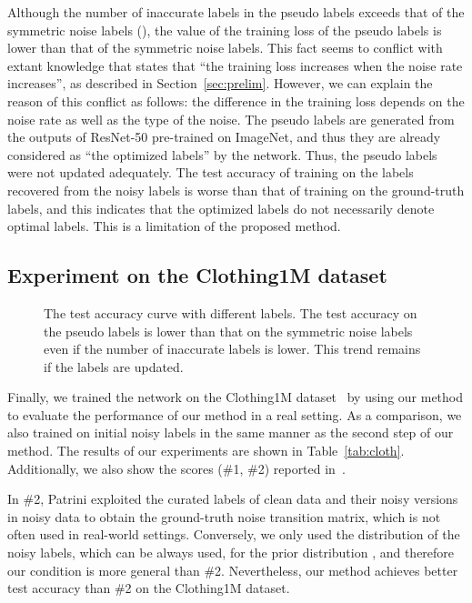 \documentclass[10pt,twocolumn,letterpaper]{article}
\newcommand{\Tref}[1]{Table~\ref{#1}}
\newcommand{\Sref}[1]{Section~\ref{#1}}
\begin{document}
Although the number of inaccurate labels in the pseudo labels exceeds that of the symmetric noise labels (), the value of the training loss of the pseudo labels is lower than that of the symmetric noise labels. This fact seems to conflict with extant knowledge that states that ``the training loss increases when the noise rate increases'', as described in \Sref{sec:prelim}. However, we can explain the reason of this conflict as follows: the difference in the training loss depends on the noise rate as well as the type of the noise.
The pseudo labels are generated from the outputs of ResNet-50 pre-trained on ImageNet, and thus they are already considered as ``the optimized labels'' by the network. Thus, the pseudo labels were not updated adequately.
The test accuracy of training on the labels recovered from the noisy labels is worse than that of training on the ground-truth labels, and this indicates that the optimized labels do not necessarily denote optimal labels. This is a limitation of the proposed method.

\subsection{Experiment on the Clothing1M dataset}\label{sec:cloth}
\begin{figure}[tb]
  \vspace{-5mm}
  \centering
  \caption{The test accuracy curve with different labels. The test accuracy on the pseudo labels is lower than that on the symmetric noise labels even if the number of inaccurate labels is lower. This trend remains if the labels are updated.}
  \label{fig:trans_a}
  \vspace{-4mm}
\end{figure}

Finally, we trained the network on the Clothing1M dataset~\cite{xiao2015learning} by using our method to evaluate the performance of our method in a real setting. As a comparison, we also trained on initial noisy labels in the same manner as the second step of our method. The results of our experiments are shown in \Tref{tab:cloth}. Additionally, we also show the scores (\#1, \#2) reported in~\cite{patrini2016making}.

In \#2, Patrini \etal exploited the curated labels of  clean data and their noisy versions in  noisy data to obtain the ground-truth noise transition matrix,
which is not often used in real-world settings. Conversely, we only used the distribution of the noisy labels, which can be always used, for the prior distribution ,
and therefore our condition is more general than \#2.
Nevertheless, our method achieves better test accuracy than \#2 on the Clothing1M dataset.
\end{document}
